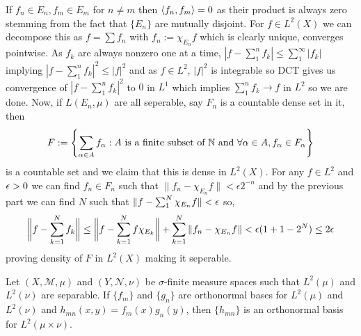 \documentclass[12pt,a4paper]{article}
\begin{document}
\begin{solution}
    If $f_n\in E_n,f_m\in E_m$ for $n\neq m$ then $\left\langle f_n,f_m\right\rangle=0$ as their product is always zero stemming from the fact that $\{E_n\}$ are mutually disjoint. 
    For $f\in L^2(X)$ we can decompose this as $f=\sum f_n$ with $f_n:=\chi_{E_n}f$ which is clearly unique, converges pointwise. 
    As $f_k$ are always nonzero one at a time, $|f-\sum_1^nf_k|\leq\sum_1^\infty|f_k|$ implying $|f-\sum_1^nf_k|^2\leq|f|^2$ and as $f\in L^2$, $|f|^2$ is integrable so DCT gives us convergence of $|f-\sum_1^nf_k|^2$ to $0$ in $L^1$ which implies $\sum_1^nf_k\to f$ in $L^2$ so we are done. 
    Now, if $L(E_n,\mu)$ are all seperable, say $F_n$ is a countable dense set in it, then 
    \[
        F:=\qty{\sum_{\alpha\in A}f_\alpha:A\text{ is a finite subset of }\mathbb{N}\text{ and }\forall\alpha\in A,f_\alpha\in F_\alpha}
    \]
    is a countable set and we claim that this is dense in $L^2(X).$ 
    For any $f\in L^2$ and $\epsilon>0$ we can find $f_n\in F_n$ such that $\|f_n-\chi_{E_n}f\|<\epsilon 2^{-n}$ and by the previous part we can find $N$ such that $\|f-\sum_1^N\chi_{E_n}f\|<\epsilon$ so,
    \[
        \bigg\|f-\sum_{k=1}^Nf_k\bigg\|\leq \bigg\|f-\sum_{k=1}^Nf\chi_{E_k}\bigg\|+\sum_{k=1}^N\|f_n-\chi_{E_n}f\|<\epsilon(1+1-2^N)\leq2\epsilon
    \]
     proving density of $F$ in $L^2(X)$ making it seperable. 
\end{solution}
\begin{problem}\label{prob:5-61}
Let $(X,\mathcal{M},\mu)$ and $(Y,\mathcal{N},\nu)$ be $\sigma$-finite measure spaces such that $L^2(\mu)$ and $L^2(\nu)$ are separable. If $\{f_m\}$ and $\{g_n\}$ are orthonormal bases for $L^2(\mu)$ and $L^2(\nu)$ and $h_{mn}(x,y) = f_m(x)g_n(y)$, then $\{h_{mn}\}$ is an orthonormal basis for $L^2(\mu \times \nu)$.
\end{problem}
\end{document}
